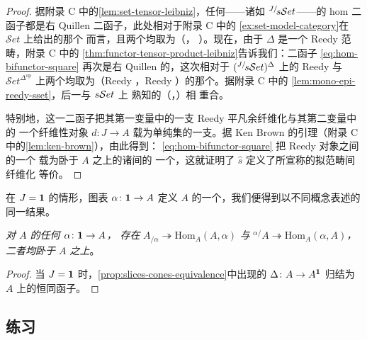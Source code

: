 \begin{proof}
据附录 C 中的\cref{lem:set-tensor-leibniz}，任何\trModelCategory{}——诸如
${}^{J/}\!s\mathcal{S}et$——的 hom 二函子都是右 Quillen 二函子，此处相对于附录 C 中的
\cref{ex:set-model-category}在 $\mathcal{S}et$ 上给出的那个\trModelStructure
而言，且两个\trWeakFactorizationSystem{}均取为（\trMonomorphism，%
\trEpimorphism）。现在，由于 $\Delta$ 是一个 Reedy 范畴，附录 C 中的%
\cref{thm:functor-tensor-product-leibniz}告诉我们：二函子
\eqref{eq:hom-bifunctor-square} 再次是右 Quillen 的，这次相对于
$({}^{J/}\!s\mathcal{S}et)^{\Delta}$ 上的 Reedy \trModelStructure{}与 $\mathcal{S}et^{\Delta^{\mathrm{op}}}$
上两个\trWeakFactorizationSystem{}均取为（Reedy \trMonomorphism，Reedy
\trEpimorphism）的那个\trModelStructure。据附录 C 中的%
\cref{lem:mono-epi-reedy-sset}，后一\trWeakFactorizationSystem{}与 $s\mathcal{S}et$ 上
熟知的（\trMonomorphism，\trTrivialFibration）\trWeakFactorizationSystem{}相
重合。

特别地，这一二函子把其第一变量中的一支 Reedy 平凡余纤维化与其第二变量中的
一个纤维性对象 $d\colon J\to A$ 载为单纯集的一支\trTrivialFibration。据 Ken
Brown 的引理（附录 C 中的\cref{lem:ken-brown}），由此得到：%
\eqref{eq:hom-bifunctor-square} 把 Reedy \trCofibrant{}对象之间的一个%
\trPointwise{}\trWeakEquivalence{}载为卧于 $A$ 之上的诸\trQuasiCategory{}间的
一个\trFiberedEquivalence，这就证明了 $\hat{s}$ 定义了所宣称的拟范畴间纤维化
等价。
\end{proof}

在 $J=\mathbf{1}$ 的情形，图表 $\alpha\colon\mathbf{1}\to A$ 定义\trQuasiCategory{} $A$
的一个\trElement，我们便得到以不同概念表述的同一结果。

\begin{corollary}\label{cor:slice-cone-point}
\emph{对\trQuasiCategory{} $A$ 的任何\trElement{} $\alpha\colon\mathbf{1}\to A$，
存在\trCanonical{}\trEquivalence}
$A_{/\alpha}\twoheadrightarrow\mathrm{Hom}_{A}(A,\alpha)$ \emph{与}
${}^{\alpha/}\!A\twoheadrightarrow\mathrm{Hom}_{A}(\alpha,A)$\emph{，二者均卧于
$A$ 之上}。
\end{corollary}

\begin{proof}
当 $J=\mathbf{1}$ 时，\cref{prop:slices-cones-equivalence}中出现的%
\trConstantFunctor{} $\Delta\colon A\to A^{\mathbf{1}}$ 归结为 $A$ 上的恒同函子。
\end{proof}

\subsection*{练习}

